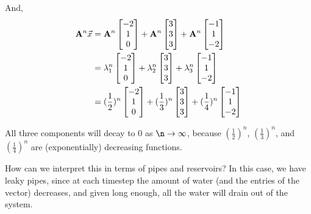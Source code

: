 \begin{enumerate}
{    And, 
    \begin{align*}
    \mathbf{A}^n\vec{x} &= \mathbf{A}^n \begin{bmatrix}-2 \\ 1 \\ 0\end{bmatrix} + \mathbf{A}^n \begin{bmatrix}3 \\ 3 \\ 3\end{bmatrix} + \mathbf{A}^n \begin{bmatrix}-1 \\ 1 \\ -2\end{bmatrix} \\
    &= \lambda_1^n \begin{bmatrix}-2 \\ 1 \\ 0\end{bmatrix} + \lambda_2^n \begin{bmatrix}3 \\ 3 \\ 3\end{bmatrix} + \lambda_3^n \begin{bmatrix}-1 \\ 1 \\ -2\end{bmatrix} \\
    &= (\frac{1}{2})^n \begin{bmatrix}-2 \\ 1 \\ 0\end{bmatrix} + (\frac{1}{3})^n \begin{bmatrix}3 \\ 3 \\ 3\end{bmatrix} + (\frac{1}{4})^n \begin{bmatrix}-1 \\ 1 \\ -2\end{bmatrix} \\
    \end{align*}
    
    All three components will decay to 0 as $\n\to\infty$, because $(\frac{1}{2})^n$, $(\frac{1}{3})^n$, and $(\frac{1}{4})^n$ are (exponentially) decreasing functions.
    
    How can we interpret this in terms of pipes and reservoirs? In this case, we have leaky pipes, since at each timestep the amount of water (and the entries of the vector) decreases, and given long enough, all the water will drain out of the system.
    
}
\end{enumerate}
